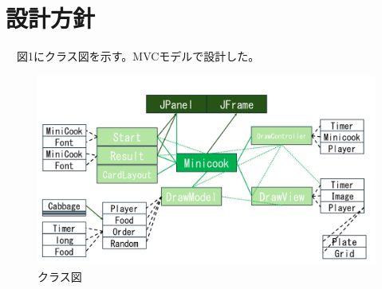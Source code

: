 \documentclass[a4j]{jarticle} %
\begin{document}
\section{設計方針}
　図1にクラス図を示す。MVCモデルで設計した。%
\begin{figure}[H]
  \begin{center}
  \includegraphics[scale=0.3]{img/class.png}
  \caption{クラス図}
  \end{center}
\end{figure}
\end{document}
